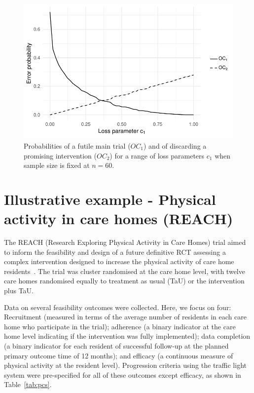 \documentclass{article} %
\begin{document}
\begin{figure}
\centering
\includegraphics[scale=0.8]{./Figures/tiga_n60}
\caption{Probabilities of a futile main trial ($OC_1$) and of discarding a promising intervention ($OC_2$) for a range of loss parameters $c_1$ when sample size is fixed at $n=60$.}
\label{fig:tiga_n60}
\end{figure}


\section{Illustrative example - Physical activity in care homes (REACH)}\label{sec:REACH}

The REACH (Research Exploring Physical Activity in Care Homes) trial aimed to inform the feasibility and design of a future definitive RCT assessing a complex intervention designed to increase the physical activity of care home residents~\cite{Forster2017}. The trial was cluster randomised at the care home level, with  twelve care homes randomised equally to treatment as usual (TaU) or the intervention plus TaU.

Data on several feasibility outcomes were collected. Here, we focus on four: Recruitment (measured in terms of the average number of residents in each care home who participate in the trial); adherence (a binary indicator at the care home level indicating if the intervention was fully implemented); data completion (a binary indicator for each resident of successful follow-up at the planned primary outcome time of 12 months); and efficacy (a continuous measure of physical activity at the resident level). Progression criteria using the traffic light system were pre-specified for all of these outcomes except efficacy, as shown in Table~\ref{tab:pcs}.
\end{document}
